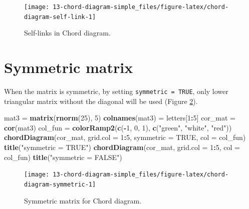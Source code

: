\documentclass[]{book}
\newenvironment{Shaded}{\begin{snugshade}}{\end{snugshade}}
\newcommand{\KeywordTok}[1]{\textcolor[rgb]{0.13,0.29,0.53}{\textbf{#1}}}
\newcommand{\DataTypeTok}[1]{\textcolor[rgb]{0.13,0.29,0.53}{#1}}
\newcommand{\DecValTok}[1]{\textcolor[rgb]{0.00,0.00,0.81}{#1}}
\newcommand{\StringTok}[1]{\textcolor[rgb]{0.31,0.60,0.02}{#1}}
\newcommand{\OtherTok}[1]{\textcolor[rgb]{0.56,0.35,0.01}{#1}}
\newcommand{\OperatorTok}[1]{\textcolor[rgb]{0.81,0.36,0.00}{\textbf{#1}}}
\newcommand{\NormalTok}[1]{#1}
\begin{document}
\begin{figure}

{\centering \texttt{[image: 13-chord-diagram-simple\_files/figure-latex/chord-diagram-self-link-1]} 

}

\caption{Self-links in Chord diagram.}\label{fig:chord-diagram-self-link}
\end{figure}

\section{Symmetric matrix}\label{symmetric-matrix}

When the matrix is symmetric, by setting \texttt{symmetric\ =\ TRUE},
only lower triangular matrix without the diagonal will be used (Figure
\ref{fig:chord-diagram-symmetric}).

\begin{Shaded}
\begin{Highlighting}[]
\NormalTok{mat3 =}\StringTok{ }\KeywordTok{matrix}\NormalTok{(}\KeywordTok{rnorm}\NormalTok{(}\DecValTok{25}\NormalTok{), }\DecValTok{5}\NormalTok{)}
\KeywordTok{colnames}\NormalTok{(mat3) =}\StringTok{ }\NormalTok{letters[}\DecValTok{1}\OperatorTok{:}\DecValTok{5}\NormalTok{]}
\NormalTok{cor_mat =}\StringTok{ }\KeywordTok{cor}\NormalTok{(mat3)}
\NormalTok{col_fun =}\StringTok{ }\KeywordTok{colorRamp2}\NormalTok{(}\KeywordTok{c}\NormalTok{(}\OperatorTok{-}\DecValTok{1}\NormalTok{, }\DecValTok{0}\NormalTok{, }\DecValTok{1}\NormalTok{), }\KeywordTok{c}\NormalTok{(}\StringTok{"green"}\NormalTok{, }\StringTok{"white"}\NormalTok{, }\StringTok{"red"}\NormalTok{))}
\KeywordTok{chordDiagram}\NormalTok{(cor_mat, }\DataTypeTok{grid.col =} \DecValTok{1}\OperatorTok{:}\DecValTok{5}\NormalTok{, }\DataTypeTok{symmetric =} \OtherTok{TRUE}\NormalTok{, }\DataTypeTok{col =}\NormalTok{ col_fun)}
\KeywordTok{title}\NormalTok{(}\StringTok{"symmetric = TRUE"}\NormalTok{)}
\KeywordTok{chordDiagram}\NormalTok{(cor_mat, }\DataTypeTok{grid.col =} \DecValTok{1}\OperatorTok{:}\DecValTok{5}\NormalTok{, }\DataTypeTok{col =}\NormalTok{ col_fun)}
\KeywordTok{title}\NormalTok{(}\StringTok{"symmetric = FALSE"}\NormalTok{)}
\end{Highlighting}
\end{Shaded}

\begin{figure}

{\centering \texttt{[image: 13-chord-diagram-simple\_files/figure-latex/chord-diagram-symmetric-1]} 

}

\caption{Symmetric matrix for Chord diagram.}\label{fig:chord-diagram-symmetric}
\end{figure}
\end{document}
